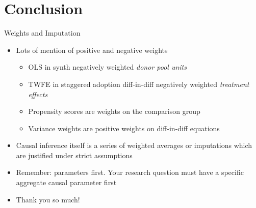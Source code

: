 \documentclass{beamer}
\begin{document}
\section{Conclusion}






\begin{frame}{Weights and Imputation}

\begin{itemize}

\item Lots of mention of positive and negative weights
	\begin{itemize}
	\item OLS in synth negatively weighted \emph{donor pool units}
	\item TWFE in staggered adoption diff-in-diff negatively weighted \emph{treatment effects}
	\item Propensity scores are weights on the comparison group
	\item Variance weights are positive weights on diff-in-diff equations
	\end{itemize}
\item Causal inference itself is a series of weighted averages or imputations which are justified under strict assumptions
\item Remember: parameters first. Your research question must have a specific aggregate causal parameter first
\item Thank you so much!

\end{itemize}

\end{frame}
\end{document}
